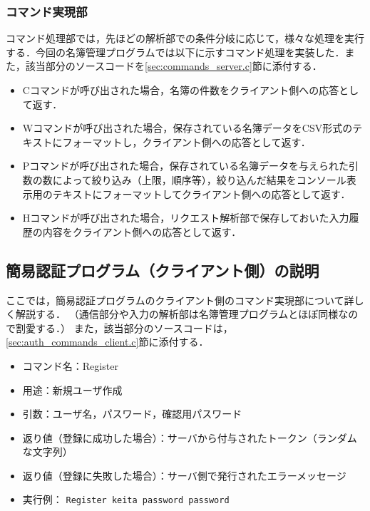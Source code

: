 \documentclass[11pt]{jsarticle}
\begin{document}
\subsubsection{コマンド実現部}

コマンド処理部では，先ほどの解析部での条件分岐に応じて，様々な処理を実行する．今回の名簿管理プログラムでは以下に示すコマンド処理を実装した．また，該当部分のソースコードを\ref{sec:commands_server.c}節に添付する．

\begin{itemize}
      \item Cコマンドが呼び出された場合，名簿の件数をクライアント側への応答として返す．
      \item Wコマンドが呼び出された場合，保存されている名簿データをCSV形式のテキストにフォーマットし，クライアント側への応答として返す．
      \item Pコマンドが呼び出された場合，保存されている名簿データを与えられた引数の数によって絞り込み（上限，順序等），絞り込んだ結果をコンソール表示用のテキストにフォーマットしてクライアント側への応答として返す．
      \item Hコマンドが呼び出された場合，リクエスト解析部で保存しておいた入力履歴の内容をクライアント側への応答として返す．
\end{itemize}

\subsection{簡易認証プログラム（クライアント側）の説明}

ここでは，簡易認証プログラムのクライアント側のコマンド実現部について詳しく解説する．
（通信部分や入力の解析部は名簿管理プログラムとほぼ同様なので割愛する．）
また，該当部分のソースコードは，\ref{sec:auth_commands_client.c}節に添付する．

\begin{itemize}
  \item コマンド名：Register
  \item 用途：新規ユーザ作成
  \item 引数：ユーザ名，パスワード，確認用パスワード
  \item 返り値（登録に成功した場合）：サーバから付与されたトークン（ランダムな文字列）
  \item 返り値（登録に失敗した場合）：サーバ側で発行されたエラーメッセージ
  \item 実行例： {\tt Register keita password password}
\end{itemize}
\end{document}
